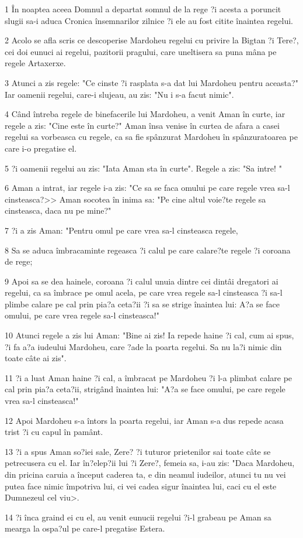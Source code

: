 \par 1 În noaptea aceea Domnul a departat somnul de la rege ?i acesta a poruncit slugii sa-i aduca Cronica însemnarilor zilnice ?i ele au fost citite înaintea regelui.
\par 2 Acolo se afla scris ce descoperise Mardoheu regelui cu privire la Bigtan ?i Tere?, cei doi eunuci ai regelui, pazitorii pragului, care uneltisera sa puna mâna pe regele Artaxerxe.
\par 3 Atunci a zis regele: "Ce cinste ?i rasplata s-a dat lui Mardoheu pentru aceasta?" Iar oamenii regelui, care-i slujeau, au zis: "Nu i s-a facut nimic".
\par 4 Când întreba regele de binefacerile lui Mardoheu, a venit Aman în curte, iar regele a zis: "Cine este în curte?" Aman însa venise în curtea de afara a casei regelui sa vorbeasca cu regele, ca sa fie spânzurat Mardoheu în spânzuratoarea pe care i-o pregatise el.
\par 5 ?i oamenii regelui au zis: "Iata Aman sta în curte". Regele a zis: "Sa intre! "
\par 6 Aman a intrat, iar regele i-a zis: "Ce sa se faca omului pe care regele vrea sa-l cinsteasca?>> Aman socotea în inima sa: "Pe cine altul voie?te regele sa cinsteasca, daca nu pe mine?"
\par 7 ?i a zis Aman: "Pentru omul pe care vrea sa-l cinsteasca regele,
\par 8 Sa se aduca îmbracaminte regeasca ?i calul pe care calare?te regele ?i coroana de rege;
\par 9 Apoi sa se dea hainele, coroana ?i calul unuia dintre cei dintâi dregatori ai regelui, ca sa îmbrace pe omul acela, pe care vrea regele sa-l cinsteasca ?i sa-l plimbe calare pe cal prin pia?a ceta?ii ?i sa se strige înaintea lui: A?a se face omului, pe care vrea regele sa-l cinsteasca!"
\par 10 Atunci regele a zis lui Aman: "Bine ai zis! Ia repede haine ?i cal, cum ai spus, ?i fa a?a iudeului Mardoheu, care ?ade la poarta regelui. Sa nu la?i nimic din toate câte ai zis".
\par 11 ?i a luat Aman haine ?i cal, a îmbracat pe Mardoheu ?i l-a plimbat calare pe cal prin pia?a ceta?ii, strigând înaintea lui: "A?a se face omului, pe care regele vrea sa-l cinsteasca!"
\par 12 Apoi Mardoheu s-a întors la poarta regelui, iar Aman s-a dus repede acasa trist ?i cu capul în pamânt.
\par 13 ?i a spus Aman so?iei sale, Zere? ?i tuturor prietenilor sai toate câte se petrecusera cu el. Iar în?elep?ii lui ?i Zere?, femeia sa, i-au zis: "Daca Mardoheu, din pricina caruia a început caderea ta, e din neamul iudeilor, atunci tu nu vei putea face nimic împotriva lui, ci vei cadea sigur înaintea lui, caci cu el este Dumnezeul cel viu>.
\par 14 ?i înca graind ei cu el, au venit eunucii regelui ?i-l grabeau pe Aman sa mearga la ospa?ul pe care-l pregatise Estera.

